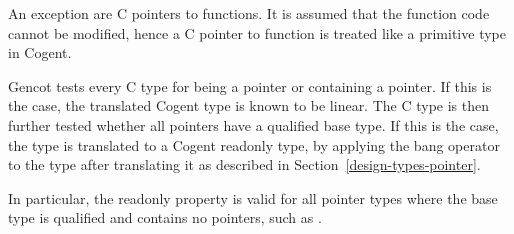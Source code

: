An exception are C pointers to functions. It is assumed that the function code cannot be modified, hence a C pointer 
to function is treated like a primitive type in Cogent.

Gencot tests every C type for being a pointer or containing a pointer. If this is the case, the translated Cogent 
type is known to be linear. The C type is then further tested whether all pointers have a  qualified
base type. If this is the case, the type is translated to a Cogent readonly type,
by applying the bang operator \code{!} to the type after translating it as described in Section~\ref{design-types-pointer}.

In particular, the readonly property is valid for all pointer types where the base type is  qualified 
and contains no pointers, such as .

